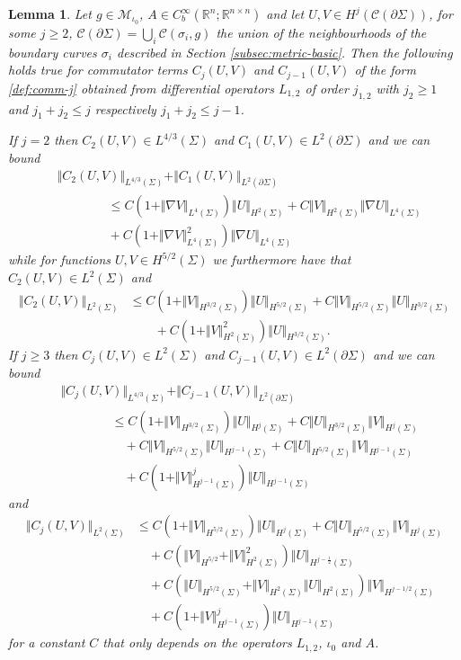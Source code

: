 \documentclass[10pt,reqno]{amsart}
\theoremstyle{plain}
\newtheorem{lemma}{Lemma}[section]
\theoremstyle{definition}
\numberwithin{equation}{section}
\newcommand{\si}{\sigma}
\newcommand{\Si}{\Sigma}
\newcommand{\R}{\ensuremath{{\mathbb R}}}
\newcommand{\norm}[1]{\Vert#1\Vert}
\newcommand{\beqa}{\begin{equation}\begin{aligned}}
\newcommand{\eeqa}{\end{aligned}\end{equation}}
\newcommand{\half}{\frac{1}{2}}
\newcommand{\na}{\nabla}
\newcommand{\Col}{\mathcal C}
\newcommand{\pSi}{{\partial \Sigma}}
\newcommand{\MM}{\mathcal{M}} %
\newcommand{\MMiota}{\MM_{\iota_0}}
\begin{document}
\begin{lemma}\label{lemma:commutator-app}
Let $g\in\MMiota$, $A \in C_b^\infty(\R^n;\R^{n\times n})$ and let $U,V\in H^{j}(\Col(\pSi))$, for some $j\geq 2$,  $\Col(\pSi)=\bigcup_i\Col(\si_i,g)$ the union of the neighbourhoods of the boundary curves $\si_i$ described in Section \ref{subsec:metric-basic}. Then the following holds true for commutator terms 
$C_{j}(U,V)$ and $C_{j-1}(U,V)$ of the form \eqref{def:comm-j} obtained from differential operators $L_{1,2}$ of order $j_{1,2}$ with $j_2\geq 1$ and $j_1+j_2\leq j$ respectively $j_1+j_2\leq j-1$.

 If $j=2$ then $C_2(U,V)\in L^{4/3}(\Si)$ and $C_1(U,V)\in L^2(\pSi)$ and we can bound
\beqa\label{est:app-c2-L43}
  &  \norm{C_2(U,V)}_{L^{4/3}(\Si)}
 +\norm{C_1(U,V)}_{L^{2}(\pSi)} \\
     & \qquad \qquad \leq C (1+\norm{ \na V}_{L^4(\Si)}) \norm{U}_{H^2(\Si)} + C\norm{V}_{H^2(\Si)}\norm{ \na U}_{L^4(\Si)}\\
 & \qquad \qquad + C(1+\norm{ \na V}_{L^4(\Si)}^2)\norm{ \na U}_{L^4(\Si)}
\eeqa
while for functions $U,V\in H^{5/2}(\Si)$ we furthermore have that $C_2(U,V)\in L^{2}(\Si)$ and
\beqa\label{est:app-c2-L2}
    \norm{C_2(U,V)}_{L^{2}(\Si)}&\leq C  (1+\norm{V}_{H^{3/2}(\Si)}) \norm{U}_{H^{5/2}(\Si)}+ C\norm{V}_{H^{5/2}(\Si)}\norm{U}_{H^{3/2}(\Si)}\\
    &\qquad +C(1+\norm{V}_{H^{2}(\Si)}^2)\norm{U}_{H^{3/2}(\Si)}.
\eeqa
If $j\geq 3$ then
 $C_j(U,V)\in L^{2}(\Si)$ and $C_{j-1}(U,V)\in L^2(\pSi)$
and we can bound 
\beqa\label{est:app-cj-L43}
   & \norm{C_j(U,V)}_{L^{4/3}(\Si)}+\norm{C_{j-1}(U,V)}_{L^{2}(\pSi)} \\
    & \qquad\qquad\leq C (1+\norm{V}_{H^{3/2}(\Si)}) \norm{U}_{H^{j}(\Si)} +C \norm{U}_{H^{3/2}(\Si)}\norm{V}_{H^{j}(\Si)}\\
    &\quad \qquad\qquad + C\norm{V}_{H^{5/2}(\Si)}\norm{U}_{H^{j-1}(\Si)} + C\norm{U}_{H^{5/2}(\Si)}\norm{V}_{H^{j-1}(\Si)}\\
    &\quad\qquad \qquad + C(1+\norm{V}_{H^{j-1}(\Si)}^j)\norm{U}_{H^{j-1}(\Si)}
\eeqa
and 
\beqa\label{est:app-cj-L2}
    \norm{C_j(U,V)}_{L^{2}(\Si)} &\leq C(1+\norm{V}_{H^{5/2}(\Si)}) \norm{U}_{H^{j}(\Si)}+ C\norm{U}_{H^{5/2}(\Si)} \norm{V}_{H^{j}(\Si)}\\
    &\quad +C(\norm{V}_{H^{5/2}}+\norm{V}_{H^2(\Si)}^2) \norm{U}_{H^{j-\half}(\Si)}\\
    &\quad + C(\norm{U}_{H^{5/2}(\Si)}+ \norm{V}_{H^2(\Si)}\norm{U}_{H^2(\Si)})\norm{V}_{H^{j-1/2}(\Si)}\\
    &\quad + C(1+\norm{V}_{H^{j-1}(\Si)}^j)\norm{U}_{H^{j-1}(\Si)}
\eeqa
for a constant $C$ that only depends on the operators $L_{1,2}$, $\iota_0$ and $A$.
\end{lemma}
\end{document}
